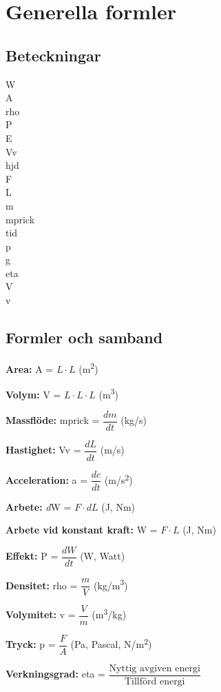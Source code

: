 \chapter{Generella formler}
\section*{Beteckningar}

\acrfull{W}\\
\acrfull{A}\\
\acrfull{rho}\\
\acrfull{P}\\
\acrfull{E}\\
\acrfull{Vv}\\
\acrfull{hjd}\\
\acrfull{F}\\
\acrfull{L}\\
\acrfull{m}\\
\acrfull{mprick}\\
\acrfull{tid}\\
\acrfull{p}\\
\acrfull{g}\\
\acrfull{eta}\\
\acrfull{V}\\
\acrfull{v}

\section*{Formler och samband}
	\textbf{Area:} \acrshort{A} = $L\cdot L $  (m\textsuperscript{2}) \par 
	\textbf{Volym:} \acrshort{V} = $L\cdot L\cdot L $   (m\textsuperscript{3}) \par
	\textbf{Massflöde:} \acrshort{mprick} = $\dfrac{dm}{dt}$  (kg/s) \par
	\textbf{Hastighet:} \acrshort{Vv} = $\dfrac{dL}{dt} $  (m/s) \par
	\textbf{Acceleration:} \acrshort{a} = $\dfrac{dc}{dt} $   (m/s\textsuperscript{2}) \par
	\textbf{Arbete:} \textit{d}\acrshort{W} = $F\cdot dL  $     (J, Nm) \par
	\textbf{Arbete vid konstant kraft:} \acrshort{W} = $ F \cdot L $  (J, Nm) \par
	\textbf{Effekt:} \acrshort{P} = $\dfrac{dW}{dt} $  (W, Watt) \par
	\textbf{Densitet:} \acrshort{rho} = $\dfrac{m}{V} $  (kg/m\textsuperscript{3}) \par
	\textbf{Volymitet:} \acrshort{v} = $\dfrac{V}{m} $  (m\textsuperscript{3}/kg) \par
	\textbf{Tryck:} \acrshort{p} = $ \dfrac{F}{A} $   (Pa, Pascal, N/m\textsuperscript{2}) \par
	\textbf{Verkningsgrad:} \acrshort{eta} = $\dfrac{\text{Nyttig avgiven energi}}{\text{Tillförd energi}} $ \par
